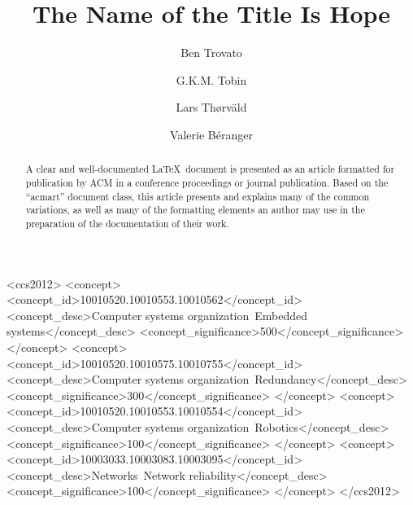 \documentclass[sigconf,anonymous]{acmart}
\theoremstyle{definition}
\begin{document}
\title{The Name of the Title Is Hope}


\author{Ben Trovato}
\author{G.K.M. Tobin}
\authornotemark[1]

\author{Lars Th{\o}rv{\"a}ld}

\author{Valerie B\'eranger}

\renewcommand{\shortauthors}{Trovato et al.}


\begin{abstract}
  A clear and well-documented \LaTeX\ document is presented as an
  article formatted for publication by ACM in a conference proceedings
  or journal publication. Based on the ``acmart'' document class, this
  article presents and explains many of the common variations, as well
  as many of the formatting elements an author may use in the
  preparation of the documentation of their work.
\end{abstract}

\begin{CCSXML}
<ccs2012>
 <concept>
  <concept_id>10010520.10010553.10010562</concept_id>
  <concept_desc>Computer systems organization~Embedded systems</concept_desc>
  <concept_significance>500</concept_significance>
 </concept>
 <concept>
  <concept_id>10010520.10010575.10010755</concept_id>
  <concept_desc>Computer systems organization~Redundancy</concept_desc>
  <concept_significance>300</concept_significance>
 </concept>
 <concept>
  <concept_id>10010520.10010553.10010554</concept_id>
  <concept_desc>Computer systems organization~Robotics</concept_desc>
  <concept_significance>100</concept_significance>
 </concept>
 <concept>
  <concept_id>10003033.10003083.10003095</concept_id>
  <concept_desc>Networks~Network reliability</concept_desc>
  <concept_significance>100</concept_significance>
 </concept>
</ccs2012>
\end{CCSXML}
\end{document}
